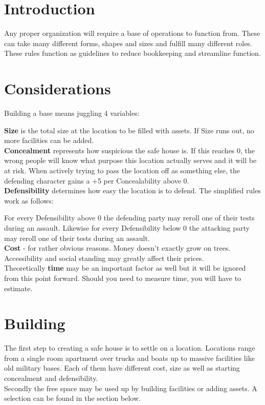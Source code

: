 \documentclass[12pt,a4paper,openany,usenames,dvipsnames]{book}
\begin{document}
	

	\chapter{Introduction}
	Any proper organization will require a base of operations to function from. These can take many different forms, shapes and sizes and fulfill many different roles. These rules function as guidelines to reduce bookkeeping and streamline function.

	\chapter{Considerations}
	Building a base means juggling 4 variables: \par
	\textbf{Size} is the total size at the location to be filled with assets. If Size runs out, no more facilities can be added.\\
	\textbf{Concealment} represents how suspicious the safe house is. If this reaches 0, the wrong people will know what purpose this location actually serves and it will be at risk. When actively trying to pass the location off as something else, the defending character gains a +5 per Concealability above 0.\\
	\textbf{Defensibility} determines how easy the location is to defend. The simplified rules work as follows: \par \vspace*{-10mm}
	\hspace{15mm}For every Defensibility above 0 the defending party may reroll one of their tests during an assault. Likewise for every Defensibility below 0 the attacking party may reroll one of their tests during an assault.\\
	\textbf{Cost} - for rather obvious reasons. Money doesn't exactly grow on trees. Accessibility and social standing may greatly affect their prices.\\
	Theoretically \textbf{time} may be an important factor as well but it will be ignored from this point forward. Should you need to measure time, you will have to estimate.

	\chapter{Building}
	The first step to creating a safe house is to settle on a location. Locations range from a single room apartment over trucks and boats up to massive facilities like old military bases. Each of them have different cost, size as well as starting concealment and defensibility. \\
	Secondly the free space may be used up by building facilities or adding assets. A selection can be found in the section below.
\end{document}
